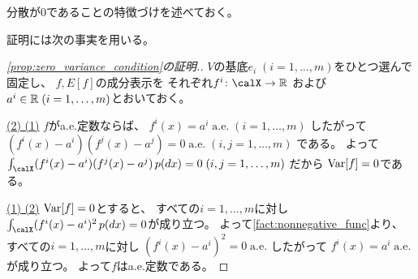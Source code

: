 \documentclass[report]{jlreq}
\begin{document}
分散が0であることの特徴づけを述べておく。


証明には次の事実を用いる。


\begin{proof}[\cref{prop:zero_variance_condition}の証明.]
    $V$の基底$e_i \; (i = 1, \dots, m)$をひとつ選んで固定し、
    $f, E[f]$の成分表示を
    それぞれ$f^i \colon \calX \to \R$
    および
    $a^i \in \mathbb{R} \; (i = 1, \dots, m)$とおいておく。

    \uline{(2) \Rightarrow (1)} \quad
    $f$がa.e.定数ならば、
    $f^i(x) = a^i \;
        \text{a.e.} \;
        (i = 1, \dots, m)$
    したがって
    $(f^i(x) - a^i)(f^j(x) - a^j) = 0 \;
        \text{a.e.} \;
        (i, j = 1, \dots, m)$
    である。
    よって
    $\int_\calX (f^i(x) - a^i)(f^j(x) - a^j) \, p(dx) = 0 \;
        (i, j = 1, \dots, m)$
    だから
    $\operatorname{Var}[f] = 0$である。

    \uline{(1) \Rightarrow (2)} \quad
    $\operatorname{Var}[f] = 0$とすると、
    すべての$i = 1, \dots, m$に対し
    $\int_\calX (f^i(x) - a^i)^2 \, p(dx) = 0$が成り立つ。
    よって\cref{fact:nonnegative_func}より、
    すべての$i = 1, \dots, m$に対し
    $(f^i(x) - a^i)^2 = 0 \;
        \text{a.e.}$
    したがって
    $f^i(x) = a^i \;
        \text{a.e.}$
    が成り立つ。
    よって$f$はa.e.定数である。
\end{proof}
\end{document}
